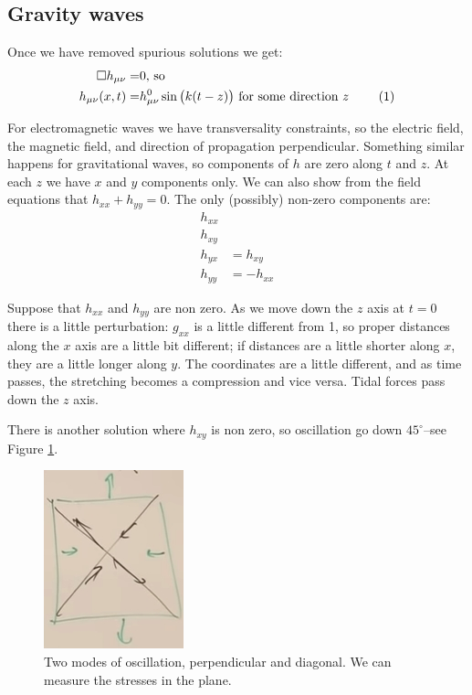 \documentclass[]{article}
\newcommand\numberthis{\addtocounter{equation}{1}\tag{\theequation}}
\begin{document}
{\subsection{Gravity waves}

Once we have removed spurious solutions we get:
\begin{align*}
	\Box h_{\mu\nu}=&0 \text{, so}\\
	h_{\mu\nu}(x,t)=&h^0_{\mu\nu} \sin\big(k(t-z)\big) \text{ for some direction $z$ } \numberthis \label{eq:sine_wave}
\end{align*}


For electromagnetic waves we have transversality constraints, so the electric field, the magnetic field, and direction of propagation perpendicular. Something similar happens for gravitational waves, so components of $h$ are zero along $t$ and $z$. At each $z$ we have $x$ and $y$ components only. We can also show from the field equations that $h_{xx}+h_{yy}=0$. The only (possibly) non-zero components are:
\begin{align*}
	h_{xx}&\\
	h_{xy}&\\
	h_{yx}&=h_{xy}\\
	h_{yy}&=-h_{xx}
\end{align*}

Suppose that $h_{xx}$ and $h_{yy}$ are non zero. As we move down the $z$ axis at $t=0$ there is a little perturbation: $g_{xx}$ is a little different from 1, so proper distances along the $x$ axis are a little bit different; if distances are a little shorter along $x$, they are a little longer along $y$. The coordinates are a little different, and as time passes, the stretching becomes a compression and vice versa. Tidal forces pass down the $z$ axis.

There is another solution where $h_{xy}$ is non zero, so oscillation go down $45^\circ$--see Figure \ref{fig:gr-10-2modes}.

\begin{figure}[H]
	\begin{center}
		\caption[Two modes of oscillation, perpendicular and diagonal]{Two modes of oscillation, perpendicular and diagonal. We can measure the stresses in the plane.}\label{fig:gr-10-2modes}
		\includegraphics{gr-10-2modes}
	\end{center}
\end{figure}

}
\end{document}
